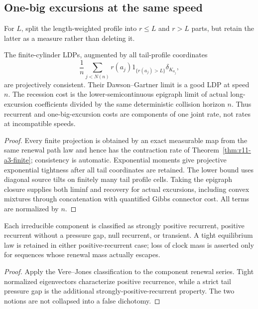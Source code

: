 \subsection{One-big excursions at the same speed}
For $L$, split the length-weighted profile into $r\le L$ and $r>L$ parts, but
retain the latter as a measure rather than deleting it.

\begin{theorem}
\label{thm:r11-a3-recession}
The finite-cylinder LDPs, augmented by all tail-profile coordinates
\[
 \frac1n\sum_{j<N(n)}r(a_j)1_{\{r(a_j)>L\}}\delta_{K_{a_j}},
\]
are projectively consistent.  Their Dawson--Gartner limit is a good LDP at
speed $n$.  The recession cost is the lower-semicontinuous epigraph limit of
actual long-excursion coefficients divided by the same deterministic
collision horizon $n$.  Thus recurrent and one-big-excursion costs are
components of one joint rate, not rates at incompatible speeds.
\end{theorem}

\begin{proof}
Every finite projection is obtained by an exact measurable map from the same
renewal path law and hence has the contraction rate of
Theorem~\ref{thm:r11-a3-finite}; consistency is automatic.  Exponential
moments give projective exponential tightness after all tail coordinates are
retained.  The lower bound uses diagonal source tilts on finitely many tail
profile cells.  Taking the epigraph closure supplies both liminf and recovery
for actual excursions, including convex mixtures through concatenation with
quantified Gibbs connector cost.  All terms are normalized by $n$.
\end{proof}

\begin{proposition}
\label{prop:r11-a3-recurrence}
Each irreducible component is classified as strongly positive recurrent,
positive recurrent without a pressure gap, null recurrent, or transient.  A
tight equilibrium law is retained in either positive-recurrent case; loss of
clock mass is asserted only for sequences whose renewal mass actually escapes.
\end{proposition}

\begin{proof}
Apply the Vere--Jones classification to the component renewal series.  Tight
normalized eigenvectors characterize positive recurrence, while a strict tail
pressure gap is the additional strongly-positive-recurrent property.  The two
notions are not collapsed into a false dichotomy.
\end{proof}


